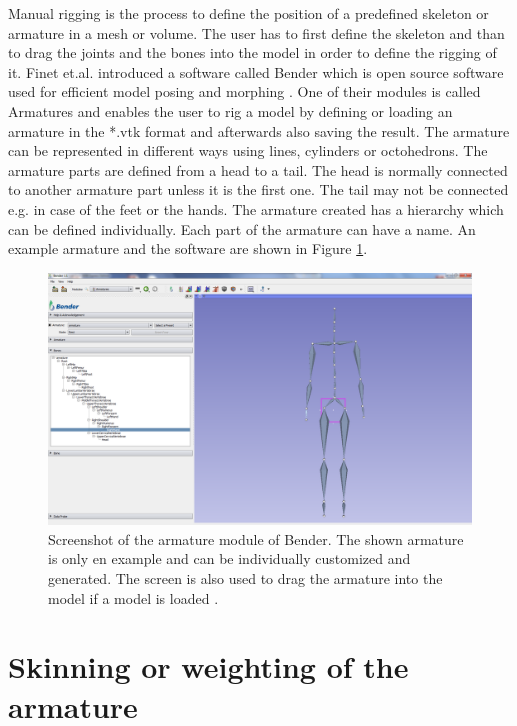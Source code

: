 Manual rigging is the process to define the position of a predefined skeleton or armature in a mesh or volume. The user has to first define the skeleton and than to drag the joints and the bones into the model in order to define the rigging of it. Finet et.al. introduced a software called Bender which is open source software used for efficient model posing and morphing \cite{Finet2014Bender:Morphing}. One of their modules is called Armatures and enables the user to rig a model by defining or loading an armature in the *.vtk format and afterwards also saving the result. The armature can be represented in different ways using lines, cylinders or octohedrons. The armature parts are defined from a head to a tail. The head is normally connected to another armature part unless it is the first one. The tail may not be connected e.g. in case of the feet or the hands. The armature created has a hierarchy which can be defined individually. Each part of the armature can have a name. An example armature and the software are shown in Figure \ref{fig:Armatures}.

\begin{figure} [htb!]
    \centering
	\includegraphics[width=14cm]{content/images/Armatures}
	\caption{Screenshot of the armature module of Bender. The shown armature is only en example and can be individually customized and generated. The screen is also used to drag the armature into the model if a model is loaded \cite{Andruejol2014BenderModules}.} 
	\label{fig:Armatures}
\end{figure}

\newpage
\section{Skinning or weighting of the armature}


